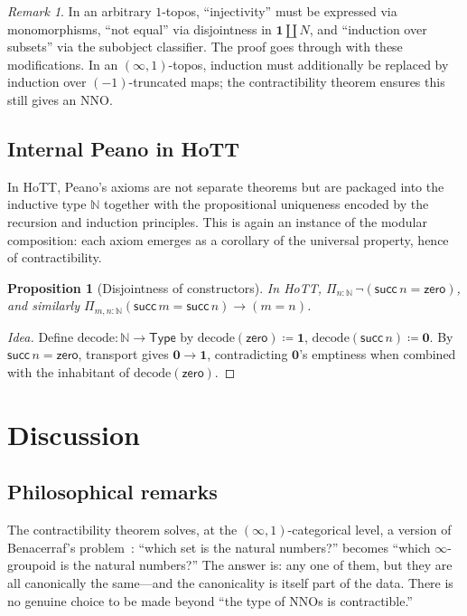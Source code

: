 \documentclass[12pt]{article}
\newtheorem{proposition}[theorem]{Proposition}
\theoremstyle{definition}
\theoremstyle{remark}
\newtheorem{remark}[theorem]{Remark}
\newcommand{\N}{\mathbb{N}}
\newcommand{\zero}{\mathsf{zero}}
\newcommand{\suc}{\mathsf{succ}}
\newcommand{\Type}{\mathsf{Type}}
\newcommand{\Pitype}{\Pi}
\begin{document}
\begin{remark}
In an arbitrary $1$-topos, ``injectivity'' must be expressed via monomorphisms, ``not equal'' via disjointness in $\mathbf{1}\amalg N$, and ``induction over subsets'' via the subobject classifier. The proof goes through with these modifications. In an $(\infty,1)$-topos, induction must additionally be replaced by induction over $(-1)$-truncated maps; the contractibility theorem ensures this still gives an NNO.
\end{remark}

\subsection{Internal Peano in HoTT}

In HoTT, Peano's axioms are not separate theorems but are packaged into the inductive type $\N$ together with the propositional uniqueness encoded by the recursion and induction principles. This is again an instance of the modular composition: each axiom emerges as a corollary of the universal property, hence of contractibility.

\begin{proposition}[Disjointness of constructors]
In HoTT, $\Pitype_{n:\N}\,\neg(\suc\,n=\zero)$, and similarly $\Pitype_{m,n:\N}(\suc\,m=\suc\,n)\to(m=n)$.
\end{proposition}

\begin{proof}[Idea]
Define $\mathrm{decode}\colon\N\to\Type$ by $\mathrm{decode}(\zero)\coloneqq\mathbf{1}$, $\mathrm{decode}(\suc\,n)\coloneqq\mathbf{0}$. By $\suc\,n=\zero$, transport gives $\mathbf{0}\to\mathbf{1}$, contradicting $\mathbf{0}$'s emptiness when combined with the inhabitant of $\mathrm{decode}(\zero)$.
\end{proof}

\section{Discussion}

\subsection{Philosophical remarks}

The contractibility theorem solves, at the $(\infty,1)$-categorical level, a version of Benacerraf's problem~\cite{Benacerraf1965}: ``which set is the natural numbers?'' becomes ``which $\infty$-groupoid is the natural numbers?'' The answer is: any one of them, but they are all canonically the same---and the canonicality is itself part of the data. There is no genuine choice to be made beyond ``the type of NNOs is contractible.''
\end{document}
